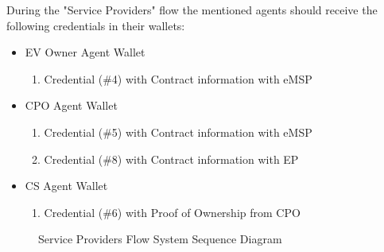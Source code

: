 During the "Service Providers" flow the mentioned agents should receive the following credentials in their wallets:
\begin{itemize}
    \item EV Owner Agent Wallet
        \begin{enumerate}
            \item Credential (\#4) with Contract information with eMSP
        \end{enumerate} 
    \item CPO Agent Wallet
        \begin{enumerate}
            \item Credential (\#5) with Contract information with eMSP
            \item Credential (\#8) with Contract information with EP
        \end{enumerate}
    \item CS Agent Wallet 
        \begin{enumerate}
            \item Credential (\#6) with Proof of Ownership from CPO
        \end{enumerate}
\end{itemize}

\begin{figure}[!h]
    \centering
    \caption{Service Providers Flow System Sequence Diagram}
    \label{fig:service_providers_ssd}
\end{figure}


